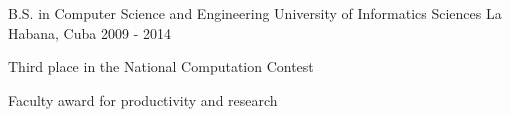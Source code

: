 


\begin{cventries}


\cventry
{B.S. in Computer Science and Engineering} %
{University of Informatics Sciences} %
{La Habana, Cuba} %
{2009 - 2014} %
{ %
\begin{cvitems}
\item {Third place in the National Computation Contest}
\item {Faculty award for productivity and research}
\end{cvitems}
}


\end{cventries}